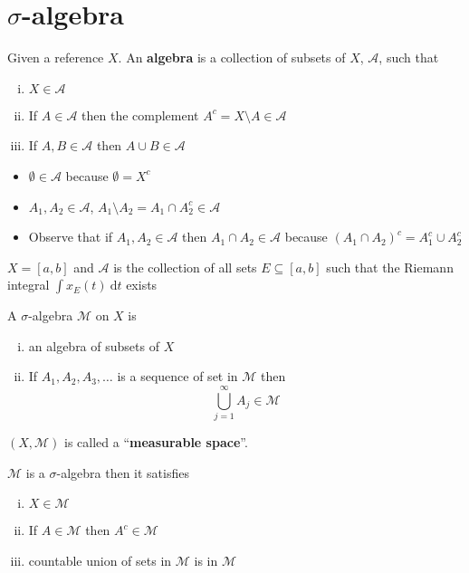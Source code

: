 \section{$\sigma$-algebra}

\begin{definition}
  Given a reference $X$. An \textbf{algebra} is a collection of subsets of $X$, $\mathcal{A}$, such that
  \begin{enumerate}[(i)]
    \item $X \in \mathcal{A}$
    \item If $A \in \mathcal{A}$ then the complement $A^c = X \setminus A \in \mathcal{A}$
    \item If $A, B \in \mathcal{A}$ then $A \cup B \in \mathcal{A}$
  \end{enumerate}
\end{definition}

\begin{remark}
  \begin{itemize}
    \item $\emptyset \in \mathcal{A}$ because $\emptyset = X^c$
    \item $A_1, A_2 \in \mathcal{A}$, $A_1 \setminus A_2 = A_1 \cap A_2^c \in \mathcal{A}$
    \item Observe that if $A_1, A_2 \in \mathcal{A}$ then $A_1 \cap A_2 \in \mathcal{A}$ because $(A_1 \cap A_2)^c = A_1^c \cup A_2^c$
  \end{itemize}
\end{remark}

\begin{example}
  $X = [a, b]$ and $\mathcal{A}$ is the collection of all sets $E \subseteq [a, b]$  
  such that the Riemann integral 
  $\int x_E(t) \ \mathrm{d}t$
 exists
\end{example}


\begin{definition}
  A $\sigma$-algebra $\mathcal{M}$ on $X$ is 
  \begin{enumerate}[(i)]
    \item an algebra of subsets of $X$
    \item If $A_1, A_2, A_3, \dotsc$ is a sequence of set in $\mathcal{M}$ then
    \[\bigcup_{j = 1}^\infty A_j \in \mathcal{M}\]
  \end{enumerate}
  $(X, \mathcal{M})$ is called a ``\textbf{measurable space}''.
\end{definition}

\begin{remark}
  $\mathcal{M}$ is a $\sigma$-algebra then it satisfies
  \begin{enumerate}[(i)] 
    \item $X \in \mathcal{M}$
    \item If $A \in \mathcal{M}$ then $A^c \in \mathcal{M}$
    \item countable union of sets in $\mathcal{M}$ is in $\mathcal{M}$ 
  \end{enumerate}
\end{remark}

